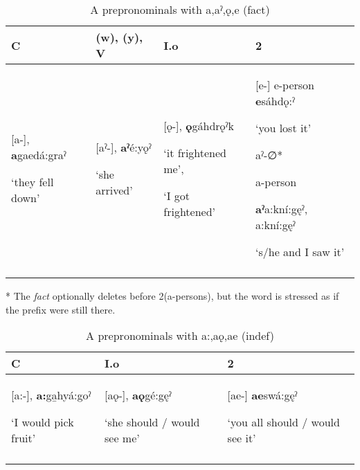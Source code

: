 \begin{table}
\caption{A prepronominals with a,aˀ,ǫ,e (fact)}
\label{tab:1:2finaldoubleprefix}
\scriptsize{
\begin{tabularx}{\textwidth}{XXXX}
\lsptoprule
C & (w), (y), V & I.o & 2  \\
\midrule
{}[a-], \textbf{a}gaedá:graˀ 

‘they fell down’ & [aˀ-], \textbf{aˀ}é:yǫˀ 

‘she arrived’ & [ǫ-], \textbf{ǫ}gáhdrǫˀk 

‘it frightened me’, 

‘I got frightened’ & [e-] e{}-person \textbf{e}sáhdǫ:ˀ 

‘you lost it’

aˀ-∅* 

a-person 

\textbf{aˀ}a:kní:gęˀ, a:kní:gęˀ 

‘s/he and I saw it’\\
\lspbottomrule
\end{tabularx}}
\end{table}
* The \textit{fact} optionally deletes before 2(a-persons), but the word is stressed as if the prefix were still there.

\lipsum[1-1]



\begin{table}
\caption{A prepronominals with a:,aǫ,ae (indef)}
\label{tab:1:finalindefprefix}
\scriptsize{
\begin{tabularx}{\textwidth}{XXX}
\lsptoprule
C & I.o & 2  \\
\midrule
{}[a:-], \textbf{a:}ga̱hyá:goˀ

‘I would pick fruit’ & [aǫ-], \textbf{aǫ}gé:gęˀ 

‘she should / would see me’ & {}[ae-] \textbf{ae}swá:gęˀ 

‘you all should / would see it’\\
\lspbottomrule
\end{tabularx}}
\end{table}


